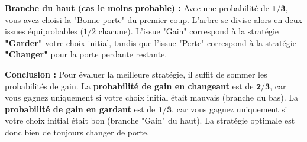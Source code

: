 \begin{proofbox}
\noindent\textbf{Branche du haut (cas le moins probable) :}
Avec une probabilité de $\mathbf{1/3}$, vous avez choisi la "Bonne porte" du premier coup. L'arbre se divise alors en deux issues équiprobables ($1/2$ chacune). L'issue "Gain" correspond à la stratégie \textbf{"Garder"} votre choix initial, tandis que l'issue "Perte" correspond à la stratégie \textbf{"Changer"} pour la porte perdante restante.

\noindent\textbf{Conclusion :}
Pour évaluer la meilleure stratégie, il suffit de sommer les probabilités de gain. La \textbf{probabilité de gain en changeant} est de $\mathbf{2/3}$, car vous gagnez uniquement si votre choix initial était mauvais (branche du bas). La \textbf{probabilité de gain en gardant} est de $\mathbf{1/3}$, car vous gagnez uniquement si votre choix initial était bon (branche "Gain" du haut). La stratégie optimale est donc bien de toujours changer de porte.
\end{proofbox}